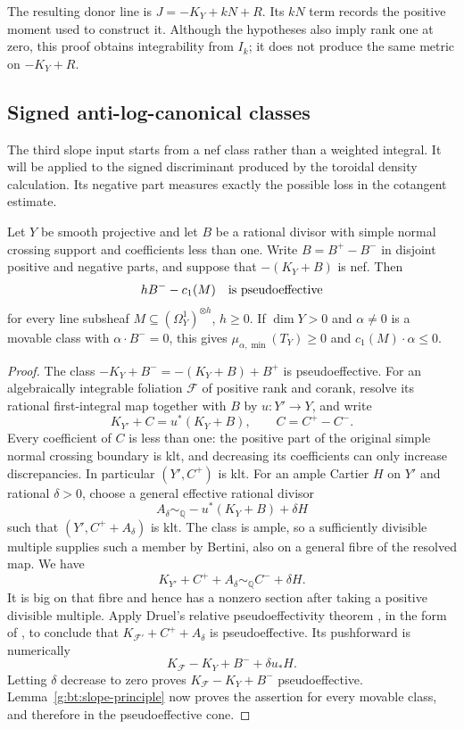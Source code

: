 The resulting donor line is $J=-K_Y+kN+R$. Its $kN$ term records the
positive moment used to construct it. Although the hypotheses also
imply rank one at zero, this proof obtains integrability from $I_k$;
it does not produce the same metric on $-K_Y+R$.

\subsection{Signed anti-log-canonical classes}
\label{g:bt:signed}

The third slope input starts from a nef class rather than a weighted
integral.  It will be applied to the signed discriminant produced by the
toroidal density calculation.  Its negative part measures exactly the
possible loss in the cotangent estimate.

\begin{proposition}
\label{g:bt:signed-slope}
Let $Y$ be smooth projective and let $B$ be a rational divisor with simple
normal crossing support and coefficients less than one.  Write
$B=B^+-B^-$ in disjoint positive and negative parts, and suppose that
$-(K_Y+B)$ is nef.  Then
\[
                         hB^- -c_1(M)
                         \quad\hbox{is pseudoeffective}
\]
for every line subsheaf $M\subseteq(\Omega_Y^1)^{\otimes h}$, $h\geq0$.
If $\dim Y>0$ and $\alpha\ne0$ is a movable class with
$\alpha\cdot B^-=0$, this gives
$\mu_{\alpha,\min}(T_Y)\geq0$ and $c_1(M)\cdot\alpha\leq0$.
\end{proposition}

\begin{proof}
The class $-K_Y+B^-=-(K_Y+B)+B^+$ is pseudoeffective.
For an algebraically integrable foliation $\mathcal F$ of positive rank
and corank, resolve its rational first-integral map together with $B$ by
$u:Y'\to Y$, and write
\[
             K_{Y'}+C=u^*(K_Y+B),\qquad C=C^+-C^-.
\]
Every coefficient of $C$ is less than one: the positive part of the
original simple normal crossing boundary is klt, and decreasing its
coefficients can only increase discrepancies.  In particular
$(Y',C^+)$ is klt.  For an ample Cartier $H$ on $Y'$ and rational
$\delta>0$, choose a general effective rational divisor
\[
        A_\delta\sim_{\mathbb Q}
                    -u^*(K_Y+B)+\delta H
\]
such that $(Y',C^++A_\delta)$ is klt.  The class is ample, so a sufficiently
divisible multiple supplies such a member by Bertini, also on a general
fibre of the resolved map.  We have
\[
        K_{Y'}+C^++A_\delta\sim_{\mathbb Q} C^-+\delta H.
\]
It is big on that fibre and hence has a nonzero section after taking a
positive divisible multiple.  Apply Druel's relative pseudoeffectivity
theorem \cite[Proposition~4.1]{Druel2017}, in the form of
\cite[Proposition~3.1]{Ou2023}, to conclude that
$K_{\mathcal F'}+C^++A_\delta$ is pseudoeffective.
Its pushforward is numerically
\[
                 K_{\mathcal F}-K_Y+B^-+\delta u_*H.
\]
Letting $\delta$ decrease to zero proves
$K_{\mathcal F}-K_Y+B^-$ pseudoeffective.
Lemma~\ref{g:bt:slope-principle} now proves the assertion for every
movable class, and therefore in the pseudoeffective cone.
\end{proof}

